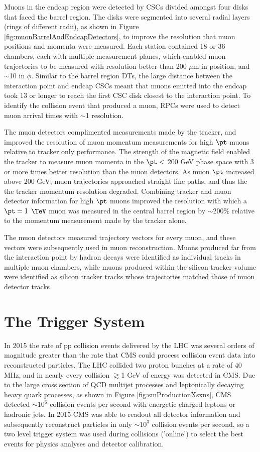 Muons in the endcap region were detected by CSCs divided amongst four disks that faced the barrel region.  
The disks were segmented into several radial layers (rings of different radii), as shown in Figure \ref{fig:muonBarrelAndEndcapDetectors}, 
to improve the resolution that muon positions and momenta were measured.  Each station contained 18 or 36 
chambers, each with multiple measurement planes, which enabled muon trajectories to be measured with resolution 
better than 200 $\mu$m in position, and $\sim$10 \mrad in $\phi$.  Similar to the barrel region DTs, the large distance between the interaction 
point and endcap CSCs meant that muons emitted into the endcap took 13 \ns or longer to reach the first CSC 
disk closest to the interaction point.  To identify the collision event that produced a muon, RPCs were used 
to detect muon arrival times with $\sim$1 \ns resolution.

The muon detectors complimented measurements made by the tracker, and improved the resolution of muon 
momentum measurements for high $\pt$ muons relative to tracker only performance.  The 
strength of the magnetic field enabled the tracker to measure muon momenta in the $\pt <$ 
200 GeV phase space with 3 or more times better resolution than the muon detectors.  As muon $\pt$ increased 
above 200 GeV, muon trajectories approached straight line paths, and thus the the tracker momentum resolution degraded.  
Combining tracker and muon detector information for high $\pt$ muons improved the resolution with which a 
$\pt = 1$ $\TeV$ muon was measured in the central barrel region by $\sim$200\% relative to the momentum 
measurement made by the tracker alone.

The muon detectors measured trajectory vectors for every muon, and these vectors were subsequently used in 
muon reconstruction.  Muons produced far from the interaction point by hadron decays were identified as 
individual tracks in multiple muon chambers, while muons produced within the silicon tracker volume were 
identified as silicon tracker tracks whose trajectories matched those of muon detector tracks.

\section{The Trigger System}
\label{sec:triggerDescription}
In 2015 the rate of pp collision events delivered by the LHC was several orders of magnitude greater than the 
rate that CMS could process collision event data into reconstructed particles.  The LHC collided two proton bunches 
at a rate of 40 MHz, and in nearly every collision $\gtrsim$1 GeV of energy was detected in CMS.  Due to the large cross 
section of QCD multijet processes and leptonically decaying heavy quark processes, as shown in Figure \ref{fig:smProductionXsxns}, CMS 
detected $\sim10^{6}$ collision events per second with energetic charged leptons or hadronic jets.  In 2015 
CMS was able to readout all detector information and subsequently reconstruct particles in only $\sim10^{3}$ 
collision events per second, so a two level trigger 
system was used during collisions ('online') to select the best events for physics analyses and detector calibration.

